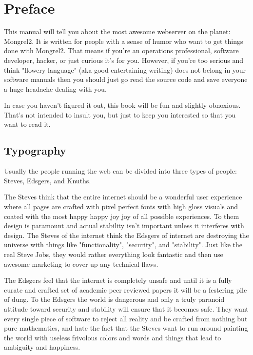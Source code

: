 \chapter*{Preface}

This manual will tell you about the most awesome webserver on the planet: Mongrel2.
It is written for people with a sense of humor who want to get things done with Mongrel2.
That means if you're an operations professional, software developer, hacker, or just
curious it's for you.  However, if you're too serious and think "flowery language"
(aka good entertaining writing) does not belong in your software manuals then you should just
go read the source code and save everyone a huge headache dealing with you.

In case you haven't figured it out, this book will be fun and slightly obnoxious.  That's
not intended to insult you, but just to keep you interested so that you want to read it.


\section*{Typography}

Usually the people running the web can be divided into three types of people:  Steves,
Edsgers, and Knuths.

The Steves think that the entire internet should be a wonderful user
experience where all pages are crafted with pixel perfect fonts with high gloss
visuals and coated with the most happy happy joy joy of all possible
experiences.  To them design is paramount and actual stability isn't important
unless it interferes with design.  The Steves of the internet think the
Edsgers of internet are destroying the universe with things like
"functionality", "security", and "stability".  Just like the real Steve Jobs, they
would rather everything look fantastic and then use awesome marketing to cover
up any technical flaws.

The Edsgers feel that the internet is completely unsafe and until it is a fully
curate and crafted set of academic peer reviewed papers it will be a festering
pile of dung.  To the Edsgers the world is dangerous and only a truly paranoid
attitude toward security and stability will ensure that it becomes safe.  They
want every single piece of software to reject all reality and be crafted from
nothing but pure mathematics, and hate the fact that the Steves want to run
around painting the world with useless frivolous colors and words and things
that lead to ambiguity and happiness.

